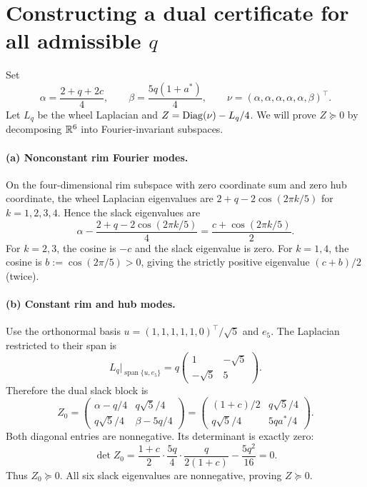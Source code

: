 \section{Constructing a dual certificate for all admissible $q$}
Set
\begin{equation}\label{eq:wheel-dual}
\alpha=\frac{2+q+2c}{4},\qquad \beta=\frac{5q(1+a^*)}{4},\qquad \nu=(\alpha,\alpha,\alpha,\alpha,\alpha,\beta)^\top.
\end{equation}
Let $L_q$ be the wheel Laplacian and $Z=\operatorname{Diag}(\nu)-L_q/4$. We will prove $Z\succeq0$ by decomposing $\mathbb{R}^6$ into Fourier-invariant subspaces.

\paragraph{(a) Nonconstant rim Fourier modes.}
On the four-dimensional rim subspace with zero coordinate sum and zero hub coordinate, the wheel Laplacian eigenvalues are $2+q-2\cos(2\pi k/5)$ for $k=1,2,3,4$. Hence the slack eigenvalues are
\[
\alpha-\frac{2+q-2\cos(2\pi k/5)}4
=\frac{c+\cos(2\pi k/5)}2.
\]
For $k=2,3$, the cosine is $-c$ and the slack eigenvalue is zero. For $k=1,4$, the cosine is $b:=\cos(2\pi/5)>0$, giving the strictly positive eigenvalue $(c+b)/2$ (twice).

\paragraph{(b) Constant rim and hub modes.}
Use the orthonormal basis $u=(1,1,1,1,1,0)^\top/\sqrt5$ and $e_5$. The Laplacian restricted to their span is
\[
L_q\big|_{\operatorname{span}\{u,e_5\}}=
q\begin{pmatrix}1&-\sqrt5\\-\sqrt5&5\end{pmatrix}.
\]
Therefore the dual slack block is
\begin{equation}\label{eq:wheel-block}
Z_0=\begin{pmatrix}
\alpha-q/4&q\sqrt5/4\\
q\sqrt5/4&\beta-5q/4
\end{pmatrix}
=\begin{pmatrix}
(1+c)/2&q\sqrt5/4\\
q\sqrt5/4&5qa^*/4
\end{pmatrix}.
\end{equation}
Both diagonal entries are nonnegative. Its determinant is exactly zero:
\[
\det Z_0=\frac{1+c}{2}\cdot\frac{5q}{4}\cdot\frac{q}{2(1+c)}-\frac{5q^2}{16}=0.
\]
Thus $Z_0\succeq0$. All six slack eigenvalues are nonnegative, proving $Z\succeq0$.

